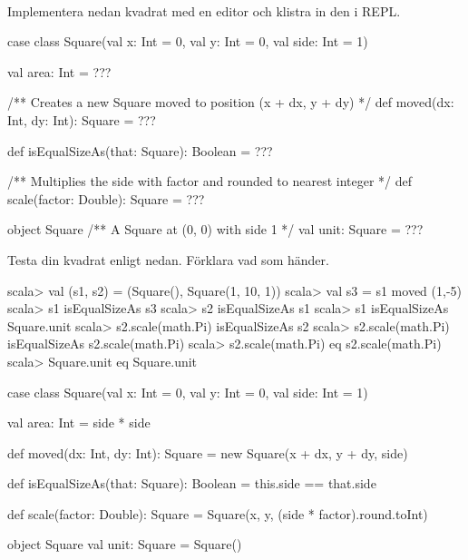 \QUESTEND





\QUESTBEGIN

\Task \label{task:Square} \what~

\Subtask Implementera nedan kvadrat med en editor och klistra in den i REPL.

\begin{Code}
case class Square(val x: Int = 0, val y: Int = 0, val side: Int = 1) {
  val area: Int = ???

  /** Creates a new Square moved to position (x + dx, y + dy) */
  def moved(dx: Int, dy: Int): Square = ???

  def isEqualSizeAs(that: Square): Boolean = ???

  /** Multiplies the side with factor and rounded to nearest integer */
  def scale(factor: Double): Square = ???
}
object Square {
  /** A Square at (0, 0) with side 1 */
  val unit: Square = ???
}
\end{Code}

\Subtask Testa din kvadrat enligt nedan. Förklara vad som händer.

\begin{REPL}
scala> val (s1, s2) = (Square(), Square(1, 10, 1))
scala> val s3 = s1 moved (1,-5)
scala> s1 isEqualSizeAs s3
scala> s2 isEqualSizeAs s1
scala> s1 isEqualSizeAs Square.unit
scala> s2.scale(math.Pi) isEqualSizeAs s2
scala> s2.scale(math.Pi) isEqualSizeAs s2.scale(math.Pi)
scala> s2.scale(math.Pi) eq s2.scale(math.Pi)
scala> Square.unit eq Square.unit
\end{REPL}

\SOLUTION

\TaskSolved \what

\SubtaskSolved

\begin{Code}
case class Square(val x: Int = 0, val y: Int = 0, val side: Int = 1) {
	val area: Int = side * side

	def moved(dx: Int, dy: Int): Square = new Square(x + dx, y + dy, side)

	def isEqualSizeAs(that: Square): Boolean = this.side == that.side

	def scale(factor: Double): Square =
    Square(x, y, (side * factor).round.toInt)
}

object Square {
	val unit: Square = Square()
}
\end{Code}

